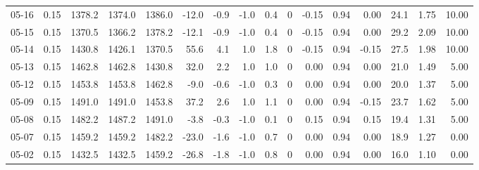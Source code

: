 \begin{threeparttable}
{\begin{tabular}{lrrrrrrrrrrrrrrr}
  05-16 &     0.15 & 1378.2 & 1374.0 & 1386.0 &      -12.0 &           -0.9 &                     -1.0 &                 0.4 &              0 &      -0.15 &      0.94 &           0.00 &             24.1 &            1.75 &                  10.00 \\
  05-15 &     0.15 & 1370.5 & 1366.2 & 1378.2 &      -12.1 &           -0.9 &                     -1.0 &                 0.4 &              0 &      -0.15 &      0.94 &           0.00 &             29.2 &            2.09 &                  10.00 \\
  05-14 &     0.15 & 1430.8 & 1426.1 & 1370.5 &       55.6 &            4.1 &                      1.0 &                 1.8 &              0 &      -0.15 &      0.94 &          -0.15 &             27.5 &            1.98 &                  10.00 \\
  05-13 &     0.15 & 1462.8 & 1462.8 & 1430.8 &       32.0 &            2.2 &                      1.0 &                 1.0 &              0 &       0.00 &      0.94 &           0.00 &             21.0 &            1.49 &                   5.00 \\
  05-12 &     0.15 & 1453.8 & 1453.8 & 1462.8 &       -9.0 &           -0.6 &                     -1.0 &                 0.3 &              0 &       0.00 &      0.94 &           0.00 &             20.0 &            1.37 &                   5.00 \\
  05-09 &     0.15 & 1491.0 & 1491.0 & 1453.8 &       37.2 &            2.6 &                      1.0 &                 1.1 &              0 &       0.00 &      0.94 &          -0.15 &             23.7 &            1.62 &                   5.00 \\
  05-08 &     0.15 & 1482.2 & 1487.2 & 1491.0 &       -3.8 &           -0.3 &                     -1.0 &                 0.1 &              0 &       0.15 &      0.94 &           0.15 &             19.4 &            1.31 &                   5.00 \\
  05-07 &     0.15 & 1459.2 & 1459.2 & 1482.2 &      -23.0 &           -1.6 &                     -1.0 &                 0.7 &              0 &       0.00 &      0.94 &           0.00 &             18.9 &            1.27 &                   0.00 \\
  05-02 &     0.15 & 1432.5 & 1432.5 & 1459.2 &      -26.8 &           -1.8 &                     -1.0 &                 0.8 &              0 &       0.00 &      0.94 &           0.00 &             16.0 &            1.10 &                   0.00 \\

\end{tabular}}
\end{threeparttable}

